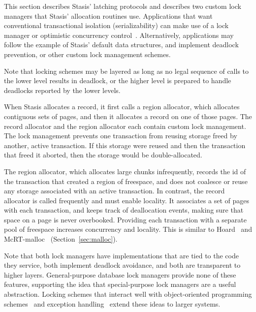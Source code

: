 \documentclass[letterpaper,twocolumn,10pt]{article}
\newcommand{\yad}{Stasis\xspace}
\newcommand{\yads}{Stasis'\xspace}
\begin{document}
This section describes \yads latching protocols and describes two custom lock
managers that \yads allocation routines use.  Applications that want
conventional transactional isolation (serializability) can make 
use of a lock manager or optimistic concurrency control~\cite{optimisticConcurrencyPerformance, optimisticConcurrencyControl}.  Alternatively, applications may follow 
the example of \yads default data structures, and implement 
deadlock prevention, or other custom lock management 
schemes.

Note that locking schemes may be
layered as long as no legal sequence of calls to the lower level
results in deadlock, or the higher level is prepared to handle
deadlocks reported by the lower levels.

When \yad allocates a
record, it first calls a region allocator, which allocates contiguous
sets of pages, and then it allocates a record on one of those pages.
The record allocator and the region allocator each contain custom lock
management.  The lock management prevents one transaction from reusing 
storage freed by another, active transaction.  If this storage were 
reused and then the transaction that freed it aborted, then the 
storage would be double-allocated.

The region allocator, which allocates large chunks infrequently, records the id
of the transaction that created a region of freespace, and does not
coalesce or reuse any storage associated with an active transaction.
In contrast, the record allocator is called frequently and must enable locality.  It associates a set of pages with
each transaction, and keeps track of deallocation events, making sure
that space on a page is never overbooked.  Providing each
transaction with a separate pool of freespace increases 
concurrency and locality.  This is 
similar to Hoard~\cite{hoard} and 
McRT-malloc~\cite{mcrt} (Section~\ref{sec:malloc}).

Note that both lock managers have implementations that are tied to the
code they service, both implement deadlock avoidance, and both are
transparent to higher layers.  General-purpose database lock managers
provide none of these features, supporting the idea that
special-purpose lock managers are a useful abstraction.  Locking
schemes that interact well with object-oriented programming
schemes~\cite{sharedAbstractTypes} and exception
handling~\cite{omtt} extend these ideas to larger systems.
\end{document}
